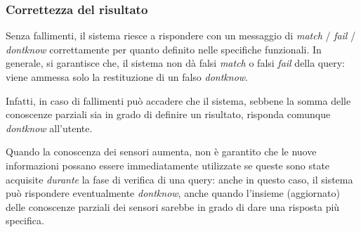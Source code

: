 \documentclass{llncs}
\begin{document}
\subsubsection*{Correttezza del risultato}
Senza fallimenti, il sistema riesce a rispondere con un messaggio di
\emph{match} / \emph{fail} / \emph{dontknow} correttamente
per quanto definito nelle specifiche funzionali.
In generale, si garantisce che,
il sistema non dà falsi \emph{match} o falsi \emph{fail} della query:
viene ammessa solo la restituzione di un falso \emph{dontknow}.

Infatti,
in caso di fallimenti può accadere che il sistema, sebbene la somma
delle conoscenze parziali sia in grado di definire un risultato,
risponda comunque \emph{dontknow} all'utente.

Quando la conoscenza dei sensori aumenta,
non è garantito che le nuove informazioni possano essere immediatamente
utilizzate se queste sono state acquisite \emph{durante} la fase di verifica
di una query: anche in questo caso, il sistema può rispondere eventualmente
\emph{dontknow}, anche quando l'insieme (aggiornato) delle conoscenze parziali
dei sensori sarebbe in grado di dare una risposta più specifica.

\end{document}
